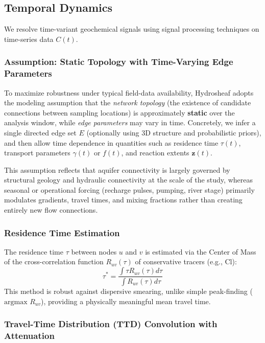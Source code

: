 \documentclass[12pt,a4paper]{article}
\theoremstyle{plain}
\theoremstyle{definition}
\theoremstyle{remark}
\begin{document}
\subsection{Temporal Dynamics}

We resolve time-variant geochemical signals using signal processing techniques on time-series data $C(t)$.

\subsubsection{Assumption: Static Topology with Time-Varying Edge Parameters}

To maximize robustness under typical field-data availability, Hydrosheaf adopts the modeling assumption that the \textit{network topology} (the existence of candidate connections between sampling locations) is approximately \textbf{static} over the analysis window, while \textit{edge parameters} may vary in time. Concretely, we infer a single directed edge set $E$ (optionally using 3D structure and probabilistic priors), and then allow time dependence in quantities such as residence time $\tau(t)$, transport parameters $\gamma(t)$ or $f(t)$, and reaction extents $\mathbf{z}(t)$.

This assumption reflects that aquifer connectivity is largely governed by structural geology and hydraulic connectivity at the scale of the study, whereas seasonal or operational forcing (recharge pulses, pumping, river stage) primarily modulates gradients, travel times, and mixing fractions rather than creating entirely new flow connections.

\subsubsection{Residence Time Estimation}

The residence time $\tau$ between nodes $u$ and $v$ is estimated via the Center of Mass of the cross-correlation function $R_{uv}(\tau)$ of conservative tracers (e.g., Cl):
\begin{equation}
	\tau^* = \frac{\int \tau R_{uv}(\tau) d\tau}{\int R_{uv}(\tau) d\tau}
\end{equation}
This method is robust against dispersive smearing, unlike simple peak-finding ($\text{argmax } R_{uv}$), providing a physically meaningful mean travel time.

\subsubsection{Travel-Time Distribution (TTD) Convolution with Attenuation}
\end{document}
